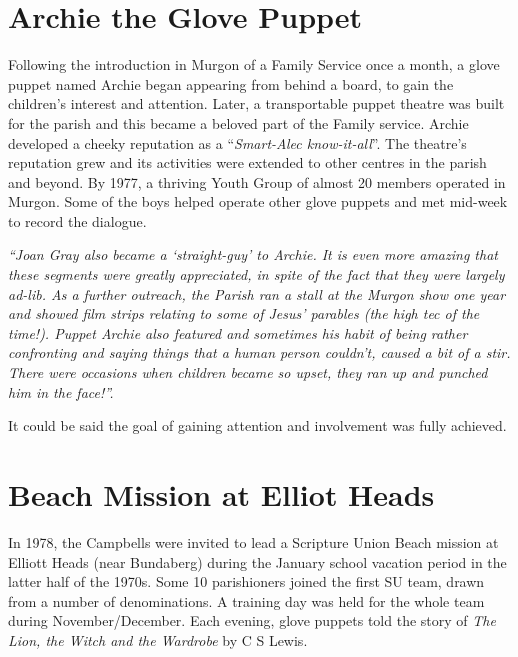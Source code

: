 \section{Archie the Glove Puppet}



Following the introduction in Murgon of a Family Service once a month, a glove puppet named Archie began appearing from behind a board, to gain the children's interest and attention. Later, a transportable puppet theatre was built for the parish and this became a beloved part of the Family service. Archie developed a cheeky reputation as a ``\emph{Smart-Alec know-it-all}''. The theatre's reputation grew and its activities were extended to other centres in the parish and beyond. By 1977, a thriving Youth Group of almost 20 members operated in Murgon. Some of the boys helped operate other glove puppets and met mid-week to record the dialogue.



\emph{``Joan Gray also became a `straight-guy' to Archie. It is even more amazing that these segments were greatly appreciated, in spite of the fact that they were largely ad-lib. As a further outreach, the Parish ran a stall at the Murgon show one year and showed film strips relating to some of Jesus' parables (the high tec of the time!). Puppet Archie also featured and sometimes his habit of being rather confronting and saying things that a human person couldn't, caused a bit of a stir. There were occasions when children became so upset, they ran up and punched him in the face!''.}



\smallskip


It could be said the goal of gaining attention and involvement was fully achieved.



\section{Beach Mission at Elliot Heads}



In 1978, the Campbells were invited to lead a Scripture Union Beach mission at Elliott Heads (near Bundaberg) during the January school vacation period in the latter half of the 1970s. Some 10 parishioners joined the first SU team, drawn from a number of denominations. A training day was held for the whole team during November/December. Each evening, glove puppets told the story of \emph{The Lion, the Witch and the Wardrobe} by C S Lewis.



